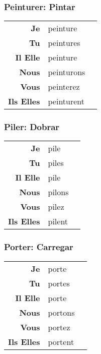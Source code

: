 \documentclass{subfiles}
\begin{document}
\begin{multicols*}{3}
        \subsubsection{Peinturer: Pintar}
            \begin{tabular}{r l r}
                \textbf{Je}        & peinture   &\\
                \textbf{Tu}        & peintures  &\\
                \textbf{Il Elle}   & peinture   &\\
                \textbf{Nous}      & peinturons &\\
                \textbf{Vous}      & peinterez  &\\
                \textbf{Ils Elles} & peinturent &
            \end{tabular}

        \subsubsection{Piler: Dobrar}
            \begin{tabular}{r l r}
                \textbf{Je}        & pile   &\\
                \textbf{Tu}        & piles  &\\
                \textbf{Il Elle}   & pile   &\\
                \textbf{Nous}      & pilons &\\
                \textbf{Vous}      & pilez  &\\
                \textbf{Ils Elles} & pilent &
            \end{tabular}

        \subsubsection{Porter: Carregar}
            \begin{tabular}{r l r}
                \textbf{Je}        & porte   &\\
                \textbf{Tu}        & portes  &\\
                \textbf{Il Elle}   & porte   &\\
                \textbf{Nous}      & portons &\\
                \textbf{Vous}      & portez  &\\
                \textbf{Ils Elles} & portent &
            \end{tabular}


\end{multicols*}
\end{document}

